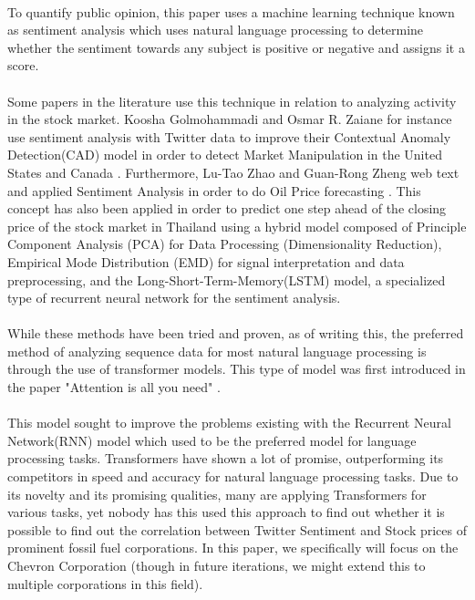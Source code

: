 \documentclass[12pt, letterpaper, titlepage]{article}
\begin{document}
\paragraph{}
	To quantify public opinion, this paper uses a machine learning technique known as sentiment analysis \cite{medhat2014sentiment} which uses natural language processing to determine whether the sentiment towards any subject is positive or negative and assigns it a score.
\paragraph{}
	 Some papers in the literature use this technique in relation to analyzing activity in the stock market. Koosha Golmohammadi and Osmar R. Zaiane for instance use sentiment analysis with Twitter data to improve their Contextual Anomaly Detection(CAD) model in order to detect Market Manipulation in the United States and Canada \cite{golmohammadi2017sentiment}. Furthermore, Lu-Tao Zhao and Guan-Rong Zheng web text and applied Sentiment Analysis in order to do Oil Price forecasting \cite{zhao2019forecasting}. This concept has also been applied in order to predict one step ahead of the closing price of the stock market in Thailand using a hybrid model composed of Principle Component Analysis (PCA) for Data Processing (Dimensionality Reduction), Empirical Mode Distribution (EMD) for signal interpretation and data preprocessing, and the Long-Short-Term-Memory(LSTM) model, a specialized type of recurrent neural network for the sentiment analysis. \cite{srijiranon2022hybrid}
\paragraph{}
	While these methods have been tried and proven, as of writing this, the preferred method of analyzing sequence data for most natural language processing is through the use of transformer models. This type of model was first introduced in the paper "Attention is all you need" \cite{vaswani2017attention}. 
\paragraph{}
	This model sought to improve the problems existing with the Recurrent Neural Network(RNN) model which used to be the preferred model for language processing tasks. Transformers have shown a lot of promise, outperforming its competitors in speed and accuracy for natural language processing tasks. Due to its novelty and its promising qualities, many are applying Transformers for various tasks, yet nobody has this used this approach to find out whether it is possible to find out the correlation between Twitter Sentiment and Stock prices of prominent fossil fuel corporations. In this paper, we specifically will focus on the Chevron Corporation (though in future iterations, we might extend this to multiple corporations in this field).
\end{document}
